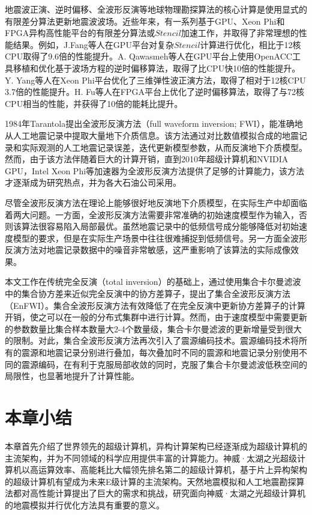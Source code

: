 地震波正演、逆时偏移、全波形反演等地球物理勘探算法的核心计算是使用显式的有限差分算法更新地震波波场。近些年来，有一系列基于GPU、Xeon Phi和FPGA异构高性能平台的有限差分算法或$Stencil$加速工作，并取得了非常理想的性能结果\cite{qawasmeh2015gpu,martinez2015towards,fang2015optimizing,liu20153d,clapp2015seismic,costa2015half,fu2012revisiting,clapp2010selecting}。例如，J.Fang等人在GPU平台对复杂$Stencil$计算进行优化，相比于12核CPU取得了9.6倍的性能提升\cite{fang2015optimizing}。A. Qawasmeh等人在GPU平台上使用OpenACC工具移植和优化基于波场方程的逆时偏移算法，取得了比CPU快10倍的性能提升\cite{qawasmeh2015gpu}。Y. Yang等人在Xeon Phi平台优化了三维弹性波正演方法，取得了相对于12核CPU 3.7倍的性能提升\cite{you2013accelerating}。H. Fu等人在FPGA平台上优化了逆时偏移算法，取得了与72核CPU相当的性能，并获得了10倍的能耗比提升。

1984年Tarantola提出全波形反演方法（full waveform inversion; FWI），能准确地从人工地震记录中提取大量地下介质信息\cite{tarantola1984inversion,plessix2012full,brossier2009seismic}。该方法通过对比数值模拟合成的地震记录和实际观测的人工地震记录误差，迭代更新模型参数，从而反演地下介质模型\cite{yushu}。然而，由于该方法伴随着巨大的计算开销，直到2010年超级计算机和NVIDIA GPU，Intel Xeon Phi等加速器为全波形反演方法提供了足够的计算能力，该方法才逐渐成为研究热点，并为各大石油公司采用。

尽管全波形反演方法在理论上能够很好地反演地下介质模型，在实际生产中却面临着两大问题。一方面，全波形反演方法需要非常准确的初始速度模型作为输入，否则该算法很容易陷入局部最优\cite{virieux2009overview}。虽然地震记录中的低频信号成分能够降低对初始速度模型的要求，但是在实际生产场景中往往很难捕捉到低频信号\cite{sirgue2006importance}。另一方面全波形反演方法对地震记录数据中的噪音非常敏感，这严重影响了该算法的实际成像效果。

本文工作在传统完全反演\cite{tarantola1982generalized}（total inversion）的基础上，通过使用集合卡尔曼滤波\cite{evensen2003ensemble}中的集合协方差来近似完全反演中的协方差算子，提出了集合全波形反演方法（EnFWI）\cite{yushu,he2015ensemble}。集合全波形反演方法有效降低了在完全反演中更新协方差算子的计算开销，使之可以在一般的分布式集群中进行计算。然而，由于速度模型中需要更新的参数数量比集合样本数量大2-4个数量级，集合卡尔曼滤波的更新增量受到很大的限制。对此，集合全波形反演方法再次引入了震源编码技术\cite{krebs2009fast}。震源编码技术将所有的震源和地震记录分别进行叠加，每次叠加时不同的震源和地震记录分别使用不同的震源编码，在有利于克服局部收敛的同时\cite{castellanos2014fast}，克服了集合卡尔曼滤波低秩空间的局限性，也显著地提升了计算性能。

\section{本章小结}

本章首先介绍了世界领先的超级计算机，异构计算架构已经逐渐成为超级计算机的主流架构，并为不同领域的科学应用提供丰富的计算能力。神威·太湖之光超级计算机以高运算效率、高能耗比大幅领先排名第二的超级计算机，基于片上异构架构的超级计算机有望成为未来E级计算的主流架构。天然地震模拟和人工地震勘探算法都对高性能计算提出了巨大的需求和挑战，研究面向神威·太湖之光超级计算机的地震模拟并行优化方法具有重要的意义。
